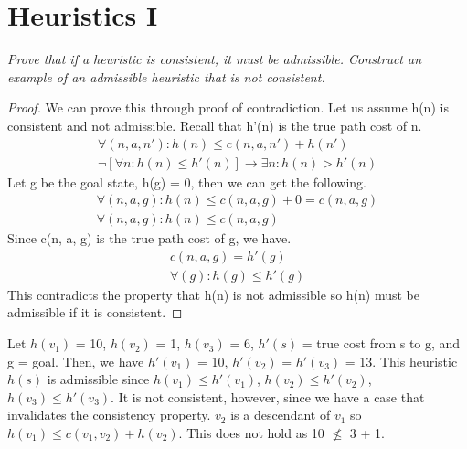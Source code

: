 \documentclass{article}
\begin{document}
\section{Heuristics I}
\textit{Prove that if a heuristic is consistent, it must be admissible. Construct an example of an admissible heuristic that is not consistent.}
\begin{proof}
We can prove this through proof of contradiction. Let us assume h(n) is consistent and not admissible. Recall that h'(n) is the true path cost of n.
\begin{align*}
\forall (n,a,n'): h(n) \leq c(n,a,n') + h(n')\\
\neg[\forall n: h(n) \leq h'(n)] \rightarrow \exists n: h(n) > h'(n)
\end{align*}
Let g be the goal state, h(g) = 0, then we can get the following.
\begin{align*}
\forall (n,a,g): h(n) \leq c(n, a, g) + 0 = c(n, a, g) \\
\forall (n,a,g): h(n) \leq c(n, a, g)
\end{align*}
Since c(n, a, g) is the true path cost of g, we have.
\begin{align*}
c(n, a, g) = h'(g) \\
\forall (g): h(g) \leq h'(g)
\end{align*}
This contradicts the property that h(n) is not admissible so h(n) must be admissible if it is consistent.
\end{proof}
\begin{center}
\end{center}
Let $h(v_1)$ = 10, $h(v_2)$ = 1, $h(v_3)$ = 6, $h'(s)$ = true cost from s to g, and g = goal. Then, we have $h'(v_1)$ = 10, $h'(v_2)$ = $h'(v_3)$ = 13. This heuristic $h(s)$ is admissible since $h(v_1) \le h'(v_1)$, $h(v_2) \le h'(v_2)$, $h(v_3) \le h'(v_3)$. It is not consistent, however, since we have a case that invalidates the consistency property. $v_2$ is a descendant of $v_1$ so $h(v_1) \le c(v_1, v_2) + h(v_2)$. This does not hold as 10 $\nleq$ 3 + 1. 
\newpage
\end{document}
